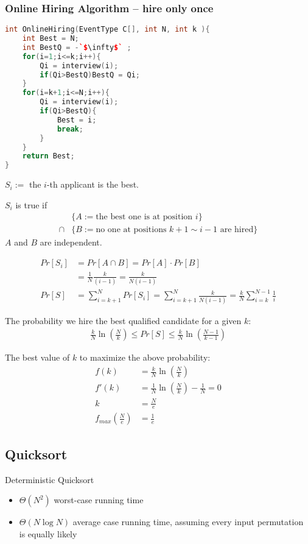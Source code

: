 \subsubsection{Online Hiring Algorithm – hire only once}
\begin{lstlisting}[language={c++}]
int OnlineHiring(EventType C[], int N, int k ){
    int Best = N;
    int BestQ = -`$\infty$` ;
    for(i=1;i<=k;i++){
        Qi = interview(i);
        if(Qi>BestQ)BestQ = Qi;
    }
    for(i=k+1;i<=N;i++){
        Qi = interview(i);
        if(Qi>BestQ){
            Best = i;
            break;
        }
    }
    return Best;
}
\end{lstlisting}

$S_i:=$ the $i$-th applicant is the best. 

$S_i$ is true if
\begin{align*}
    &\{ A:= \text{the best one is at position $i$} \} \\
    \cap &\{ B:=  \text{no one at positions $k+1 \sim i-1$ are hired} \}    
\end{align*}
$A$ and $B$ are independent. 

\begin{align*}
    Pr[S_i]&=Pr[A\cap B]=Pr[A]\cdot Pr[B]\\
    &=\frac{1}{N}\frac{k}{(i-1)}=\frac{k}{N(i-1)}\\
    Pr[S]&=\sum_{i=k+1}^N Pr[S_i]=\sum_{i=k+1}^N\frac{k}{N(i-1)}=\frac{k}{N}\sum_{i=k}^{N-1}\frac{1}{i}
\end{align*}

The probability we hire the best qualified candidate for a given $k$:
\begin{align*}
    \frac{k}{N}\ln\left( \frac{N}{k} \right)\le Pr[S] \le \frac{k}{N}\ln\left( \frac{N-1}{k-1} \right)
\end{align*}

The best value of $k$ to maximize the above probability:
\begin{align*}
    f(k)&=\frac{k}{N}\ln\left( \frac{N}{k} \right)\\
    f'(k)&=\frac{1}{N}\ln\left( \frac{N}{k} \right)-\frac{1}{N}=0\\
    k&=\frac{N}{e}\\
    f_{max}\left(\frac{N}{e}\right)&=\frac{1}{e}
\end{align*}

\subsection{Quicksort}
Deterministic Quicksort
\begin{itemize}
    \item $\Theta (N^2)$ worst-case running time
    \item $\Theta(N \log N)$ average case running time, assuming every input permutation is equally likely    
\end{itemize}

